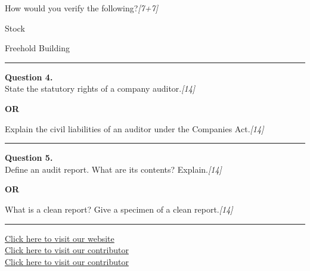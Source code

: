 \documentclass[11pt,a4paper]{article}
\newcommand{\pts}[1]{\hfill   \textit{[#1]}}
\begin{document}
How would you verify the following?\pts{7+7}

\begin{parts}
  \item Stock
  \item Freehold Building
\end{parts}

\medskip\rule{\linewidth}{0.2pt}




\noindent   \textbf{Question 4.} \\
State the statutory rights of a company auditor.\pts{14}

\centerline{   \textbf{OR}}

Explain the civil liabilities of an auditor under the Companies Act.\pts{14}

\medskip\rule{\linewidth}{0.2pt}




\noindent   \textbf{Question 5.} \\
Define an audit report. What are its contents? Explain.\pts{14}

\centerline{   \textbf{OR}}

What is a clean report? Give a specimen of a clean report.\pts{14}

\vfill
\rule{\linewidth}{0.4pt}

\begin{center}\small
\href{https://bhu-exam.vercel.app/}{Click here to visit our website}\\[4pt]
\href{https://me-aryan.vercel.app/}{Click here to visit our contributor}\\[4pt]
\href{https://quashan-me.vercel.app/}{Click here to visit our contributor}
\end{center}
\end{document}
